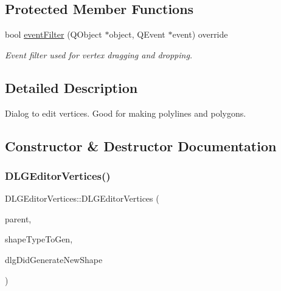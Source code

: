 \subsection*{Protected Member Functions}
\begin{DoxyCompactItemize}
\item 
bool \mbox{\hyperlink{class_d_l_g_editor_vertices_a2e6c698e2749d8c3a2dedcdcf95a1c79}{event\+Filter}} (Q\+Object $\ast$object, Q\+Event $\ast$event) override
\begin{DoxyCompactList}\small\item\em Event filter used for vertex dragging and dropping. \end{DoxyCompactList}\end{DoxyCompactItemize}


\subsection{Detailed Description}
Dialog to edit vertices. Good for making polylines and polygons. 



\subsection{Constructor \& Destructor Documentation}
\mbox{\label{class_d_l_g_editor_vertices_a504eb7ba34267ade2ef50d1220672e85}} 
\subsubsection{\texorpdfstring{DLGEditorVertices()}{DLGEditorVertices()}\hspace{0.1cm}{\footnotesize\ttfamily [1/2]}}
{\footnotesize\ttfamily D\+L\+G\+Editor\+Vertices\+::\+D\+L\+G\+Editor\+Vertices (\begin{DoxyParamCaption}\item[{Q\+Widget $\ast$}]{parent,  }\item[{\mbox{\hyperlink{class_i_shape_a8f50993477b5ddb44c0547ef3d547cdc}{I\+Shape\+::\+Shape\+Type}}}]{shape\+Type\+To\+Gen,  }\item[{std\+::function$<$ void(\mbox{\hyperlink{class_i_shape}{I\+Shape}} $\ast$)$>$}]{dlg\+Did\+Generate\+New\+Shape }\end{DoxyParamCaption})\hspace{0.3cm}{\ttfamily [explicit]}}



